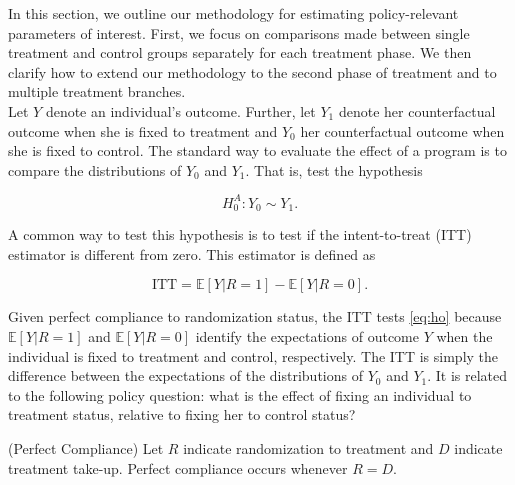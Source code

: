 \noindent In this section, we outline our methodology for estimating policy-relevant parameters of interest. First, we focus on comparisons made between single treatment and control groups separately for each treatment phase. We then clarify how to extend our methodology to the second phase of treatment and to multiple treatment branches.\\

\noindent Let $Y$ denote an individual's outcome. Further, let $Y_{1}$ denote her counterfactual outcome when she is fixed to treatment and $Y_{0}$ her counterfactual outcome when she is fixed to control. The standard way to evaluate the effect of a program is to compare the distributions of $Y_{0}$ and $Y_{1}$. That is, test the hypothesis 

\begin{equation}
H_{0}^A: Y_{0} \sim Y_{1}. \label{eq:ho}
\end{equation}

\noindent A common way to test this hypothesis is to test if the intent-to-treat (ITT) estimator is different from zero. This estimator is defined as 

\begin{equation}
\text{ITT} = \mathbb{E} \left[ Y | R = 1 \right] - \mathbb{E} \left[ Y | R = 0 \right]. \label{eq:itt}
\end{equation} 

\noindent Given perfect compliance to randomization status, the ITT tests \eqref{eq:ho} because $\mathbb{E} \left[ Y | R = 1 \right]$ and $\mathbb{E} \left[ Y | R = 0 \right]$ identify the expectations of outcome $Y$ when the individual is fixed to treatment and control, respectively. The ITT is simply the difference between the expectations of the distributions of $Y_{0}$ and $Y_{1}$. It is related to the following policy question: what is the effect of fixing an individual to treatment status, relative to fixing her to control status?\\

\noindent \begin{assumption} \normalfont (Perfect Compliance) Let $R$ indicate randomization to treatment and $D$ indicate treatment take-up. Perfect compliance occurs whenever  $R = D$.\end{assumption}

